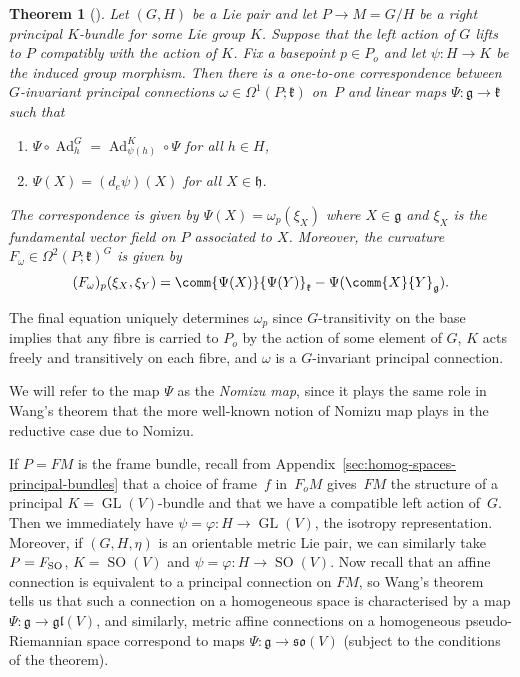 \documentclass[pdftex]{sigma}
\numberwithin{equation}{section}
\newtheorem{Theorem}{Theorem}[section]
\newcommand{\fg}{\mathfrak{g}}
\newcommand{\fh}{\mathfrak{h}}
\newcommand{\fk}{\mathfrak{k}}
\newcommand{\fgl}{\mathfrak{gl}}
\newcommand{\fso}{\mathfrak{so}}
\newcommand{\1}{\mathbbm{1}}
\DeclareMathOperator{\GL}{GL}
\DeclareMathOperator{\SO}{SO}
\DeclareMathOperator{\Ad}{Ad}
\begin{document}
\begin{Theorem}[\cite{Wang1958}]\label{thm:Wang}
	Let $(G,H)$ be a Lie pair and let $P\to M=G/H$ be a right principal $K$-bundle for some Lie group $K$. Suppose that the left action of $G$ lifts to $P$ compatibly with the action of $K$. Fix a basepoint $p\in P_o$ and let $\psi\colon H\to K$ be the induced group morphism. Then there is a one-to-one correspondence between~$G$-invariant principal connections $\omega\in\Omega^1(P;\fk)$ on~$P$ and linear maps $\Psi\colon \fg\to\fk$ such that
	\begin{enumerate}\itemsep=0pt
		\item[$(1)$] $\Psi\circ\Ad^G_h = \Ad^K_{\psi(h)}\circ\Psi$ for all $h\in H$,
		\item[$(2)$] $\Psi(X)=(d_e\psi)(X)$ for all $X\in\fh$.
	\end{enumerate}
	The correspondence is given by
$\Psi(X) = \omega_p(\xi_X)
$
	where $X\in \fg$ and $\xi_X$ is the fundamental vector field on $P$ associated to $X$. Moreover, the curvature $F_\omega\in\Omega^2(P;\fk)^G$ is given by
	\[
(F_\omega)_p(\xi_X,\xi_Y) = \comm{\Psi(X)}{\Psi(Y)}_\fk - \Psi(\comm{X}{Y}_\fg).
	\]
\end{Theorem}

The final equation uniquely determines $\omega_p$ since $G$-transitivity on the base implies that any fibre is carried to $P_o$ by the action of some element of $G$, $K$ acts freely and transitively on each fibre, and $\omega$ is a $G$-invariant principal connection.

We will refer to the map $\Psi$ as the \emph{Nomizu map}, since it plays the same role in Wang's theorem that the more well-known notion of Nomizu map plays in the reductive case due to Nomizu.

If $P=FM$ is the frame bundle, recall from Appendix~\ref{sec:homog-spaces-principal-bundles} that a choice of frame~$f$ in~$F_oM$ gives~$FM$ the structure of a principal $K=\GL(V)$-bundle and that we have a compatible left action of~$G$. Then we immediately have $\psi=\varphi\colon H\to\GL(V)$, the isotropy representation. Moreover, if $(G,H,\eta)$ is an orientable metric Lie pair, we can similarly take $P=F_{\rm SO}$, ${K=\SO(V)}$ and $\psi=\varphi\colon H\to\SO(V)$. Now recall that an affine connection is equivalent to a principal connection on $FM$, so Wang's theorem tells us that such a connection on a homogeneous space is characterised by a map $\Psi\colon \fg\to\fgl(V)$, and similarly, metric affine connections on a homogeneous pseudo-Riemannian space correspond to maps $\Psi\colon \fg\to\fso(V)$ (subject to the conditions of the theorem).
\end{document}
